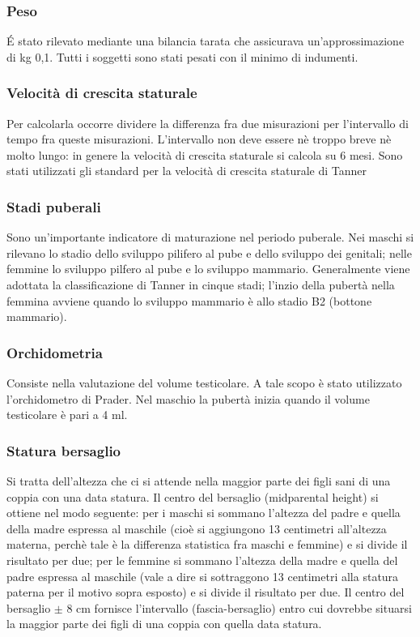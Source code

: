   
\subsubsection*{Peso}
 \'E stato rilevato mediante una bilancia tarata che assicurava un'approssimazione di kg 0,1. Tutti i soggetti sono stati pesati con il minimo di indumenti.

\subsubsection*{Velocità di crescita staturale}
Per calcolarla occorre dividere la differenza fra due misurazioni per l'intervallo di tempo fra queste misurazioni. L'intervallo non deve essere nè troppo breve nè molto lungo: in genere la velocità di crescita staturale si calcola su 6 mesi. Sono stati utilizzati gli standard per la velocità di crescita staturale di Tanner%

\subsubsection*{Stadi puberali}
Sono un'importante indicatore di maturazione nel periodo puberale. Nei maschi si rilevano lo stadio dello sviluppo pilifero al pube e dello sviluppo dei genitali; nelle femmine lo sviluppo pilfero al pube e lo sviluppo mammario. Generalmente viene adottata la classificazione di Tanner\cite{tanner1990foetus} in cinque stadi; l'inzio della pubertà nella femmina avviene quando lo sviluppo mammario è allo stadio B2 (bottone mammario). 

\subsubsection*{Orchidometria}
Consiste nella valutazione del volume testicolare. A tale scopo è stato utilizzato l'orchidometro di Prader. Nel maschio la pubertà inizia quando il volume testicolare è pari a 4 ml.  


\subsubsection*{Statura bersaglio}
Si tratta dell'altezza che ci si attende nella maggior parte dei figli sani di una coppia con una data statura. Il centro del bersaglio (midparental height) si ottiene nel modo seguente: per i maschi si sommano l'altezza del padre e quella della madre espressa al maschile (cioè si aggiungono 13 centimetri all'altezza materna, perchè tale è la differenza statistica fra maschi e femmine) e si divide il risultato per due; per le femmine si sommano l'altezza della madre e quella del padre espressa al maschile (vale a dire si sottraggono 13 centimetri alla statura paterna per il motivo sopra esposto) e si divide il risultato per due. 
Il centro del bersaglio $\pm$ 8 cm fornisce l'intervallo (fascia-bersaglio) entro cui dovrebbe situarsi la maggior parte dei figli di una coppia con quella data statura.

